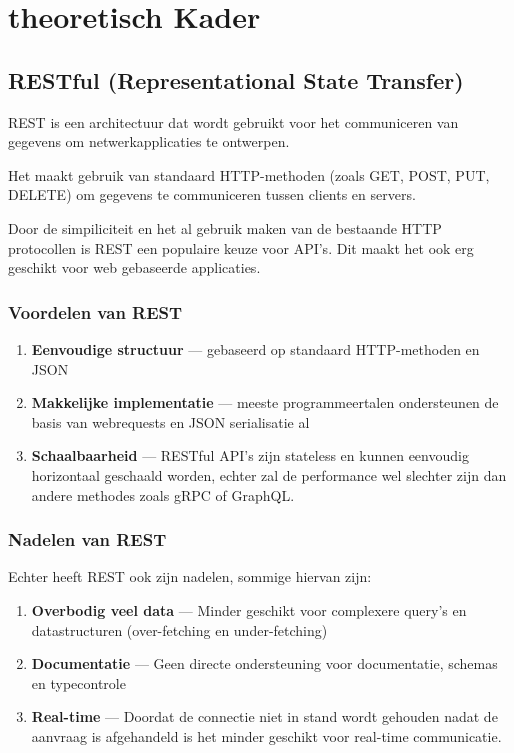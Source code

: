 \section{theoretisch Kader}
\label{sec:theoretisch kader}

\subsection{RESTful (Representational State Transfer)}
\label{ssec:rest}
REST is een architectuur dat wordt gebruikt voor het communiceren van gegevens
om netwerkapplicaties te ontwerpen.

Het maakt gebruik van standaard HTTP-methoden (zoals GET, POST, PUT, DELETE)
om gegevens te communiceren tussen clients en servers.\cite{masse2011}

Door de simpiliciteit en het al gebruik maken van de bestaande HTTP protocollen
is REST een populaire keuze voor API's. Dit maakt het ook erg geschikt voor
web gebaseerde applicaties.

\subsubsection{Voordelen van REST}
\label{sssec:voordelen en nadelen van rest}
\begin{enumerate}
  \item \textbf{Eenvoudige structuur} --- gebaseerd op standaard HTTP-methoden
   en JSON
  \item \textbf{Makkelijke implementatie} --- meeste programmeertalen ondersteunen
   de basis van webrequests en JSON serialisatie al
  \item \textbf{Schaalbaarheid} --- RESTful API's zijn stateless en kunnen
   eenvoudig horizontaal geschaald worden, echter zal de performance wel slechter
   zijn dan andere methodes zoals gRPC of GraphQL.\cite{Śliwa_Pańczyk_2021}
\end{enumerate}

\subsubsection{Nadelen van REST}
Echter heeft REST ook zijn nadelen, sommige hiervan zijn:
\begin{enumerate}
  \item \textbf{Overbodig veel data} --- Minder geschikt voor complexere query's
   en datastructuren (over-fetching en under-fetching)
  \item \textbf{Documentatie} --- Geen directe ondersteuning voor documentatie,
   schemas en typecontrole
  \item \textbf{Real-time} --- Doordat de connectie niet in stand wordt gehouden nadat
   de aanvraag is afgehandeld is het minder geschikt voor real-time communicatie.
\end{enumerate}

